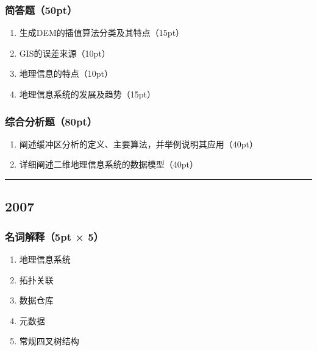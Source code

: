 \documentclass[]{article}
\begin{document}
\hypertarget{header-n305}{%
\subsubsection{简答题（50pt）}\label{header-n305}}

\begin{enumerate}
\def\labelenumi{\arabic{enumi}.}
\item
  生成DEM的插值算法分类及其特点（15pt）
\item
  GIS的误差来源（10pt）
\item
  地理信息的特点（10pt）
\item
  地理信息系统的发展及趋势（15pt）
\end{enumerate}

\hypertarget{header-n315}{%
\subsubsection{综合分析题（80pt）}\label{header-n315}}

\begin{enumerate}
\def\labelenumi{\arabic{enumi}.}
\item
  阐述缓冲区分析的定义、主要算法，并举例说明其应用（40pt）
\item
  详细阐述二维地理信息系统的数据模型（40pt）
\end{enumerate}

\begin{center}\rule{0.5\linewidth}{\linethickness}\end{center}

\hypertarget{header-n322}{%
\subsection{2007}\label{header-n322}}

\hypertarget{header-n323}{%
\subsubsection{名词解释（5pt × 5）}\label{header-n323}}

\begin{enumerate}
\def\labelenumi{\arabic{enumi}.}
\item
  地理信息系统
\item
  拓扑关联
\item
  数据仓库
\item
  元数据
\item
  常规四叉树结构
\end{enumerate}
\end{document}
